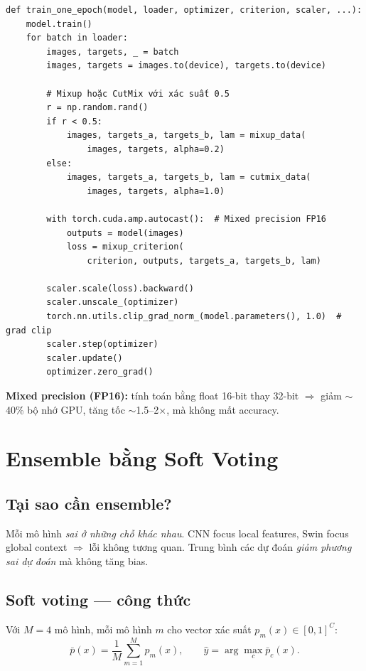 \documentclass[11pt,a4paper]{article}
\begin{document}
\begin{lstlisting}[caption={\texttt{src/engine/train\_eval.py} (rút gọn)}]
def train_one_epoch(model, loader, optimizer, criterion, scaler, ...):
    model.train()
    for batch in loader:
        images, targets, _ = batch
        images, targets = images.to(device), targets.to(device)

        # Mixup hoặc CutMix với xác suất 0.5
        r = np.random.rand()
        if r < 0.5:
            images, targets_a, targets_b, lam = mixup_data(
                images, targets, alpha=0.2)
        else:
            images, targets_a, targets_b, lam = cutmix_data(
                images, targets, alpha=1.0)

        with torch.cuda.amp.autocast():  # Mixed precision FP16
            outputs = model(images)
            loss = mixup_criterion(
                criterion, outputs, targets_a, targets_b, lam)

        scaler.scale(loss).backward()
        scaler.unscale_(optimizer)
        torch.nn.utils.clip_grad_norm_(model.parameters(), 1.0)  # grad clip
        scaler.step(optimizer)
        scaler.update()
        optimizer.zero_grad()
\end{lstlisting}

\textbf{Mixed precision (FP16):} tính toán bằng float 16-bit thay 32-bit $\Rightarrow$ giảm $\sim$40\% bộ nhớ GPU, tăng tốc $\sim$1.5--2$\times$, mà không mất accuracy.

\section{Ensemble bằng Soft Voting}

\subsection{Tại sao cần ensemble?}

Mỗi mô hình \textit{sai ở những chỗ khác nhau}. CNN focus local features, Swin focus global context $\Rightarrow$ lỗi không tương quan. Trung bình các dự đoán \textit{giảm phương sai dự đoán} mà không tăng bias.

\subsection{Soft voting --- công thức}

Với $M = 4$ mô hình, mỗi mô hình $m$ cho vector xác suất $p_m(x) \in [0, 1]^C$:
\[
  \bar{p}(x) = \frac{1}{M} \sum_{m=1}^{M} p_m(x), \qquad
  \hat{y} = \arg\max_c \bar{p}_c(x).
\]
\end{document}
